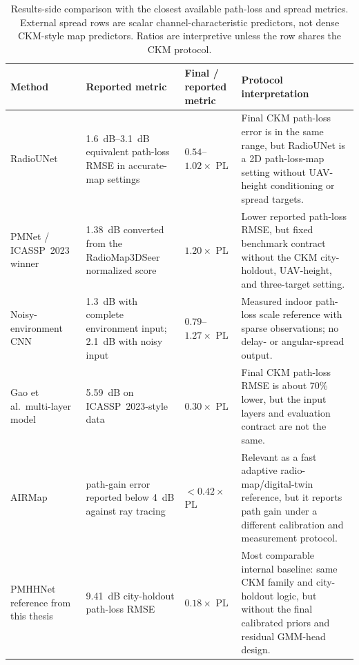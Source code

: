\begin{table}[H]
\centering
\caption[Results-side comparison with closest state-of-the-art metrics.]%
{Results-side comparison with the closest available path-loss and spread
metrics. External spread rows are scalar channel-characteristic predictors, not
dense CKM-style map predictors. Ratios are interpretive unless the row shares
the CKM protocol.}
\label{tab:soa_result_comparison}
\scriptsize
\renewcommand{\arraystretch}{1.08}
\begin{tabularx}{\textwidth}{>{\raggedright\arraybackslash}p{}
>{\raggedright\arraybackslash}p{}
>{\centering\arraybackslash}p{}
>{\raggedright\arraybackslash}X}
\toprule
Method & Reported metric & Final / reported metric & Protocol interpretation \\
\midrule
RadioUNet \cite{radiounet2020} &
\SI{1.6}{dB}--\SI{3.1}{dB} equivalent path-loss RMSE in accurate-map settings &
\(0.54\)--\(1.02\times\) PL &
Final CKM path-loss error is in the same range, but RadioUNet is a 2D
path-loss-map setting without UAV-height conditioning or spread targets. \\
PMNet / ICASSP~2023 winner \cite{pmnet2023,icassp2023challenge} &
\SI{1.38}{dB} converted from the RadioMap3DSeer normalized score &
\(1.20\times\) PL &
Lower reported path-loss RMSE, but fixed benchmark contract without the CKM
city-holdout, UAV-height, and three-target setting. \\
Noisy-environment CNN \cite{jaensch2026noisyenv} &
\SI{1.3}{dB} with complete environment input; \SI{2.1}{dB} with noisy input &
\(0.79\)--\(1.27\times\) PL &
Measured indoor path-loss scale reference with sparse observations; no delay-
or angular-spread output. \\
Gao et al.\ multi-layer model \cite{gao2026} &
\SI{5.59}{dB} on ICASSP~2023-style data &
\(0.30\times\) PL &
Final CKM path-loss RMSE is about 70\% lower, but the input layers and
evaluation contract are not the same. \\
AIRMap \cite{airmap2025} &
path-gain error reported below \SI{4}{dB} against ray tracing &
\(<0.42\times\) PL &
Relevant as a fast adaptive radio-map/digital-twin reference, but it reports
path gain under a different calibration and measurement protocol. \\
PMHHNet reference from this thesis &
\SI{9.41}{dB} city-holdout path-loss RMSE &
\(0.18\times\) PL &
Most comparable internal baseline: same CKM family and city-holdout logic, but
without the final calibrated priors and residual GMM-head design. \\

\end{tabularx}
\end{table}
